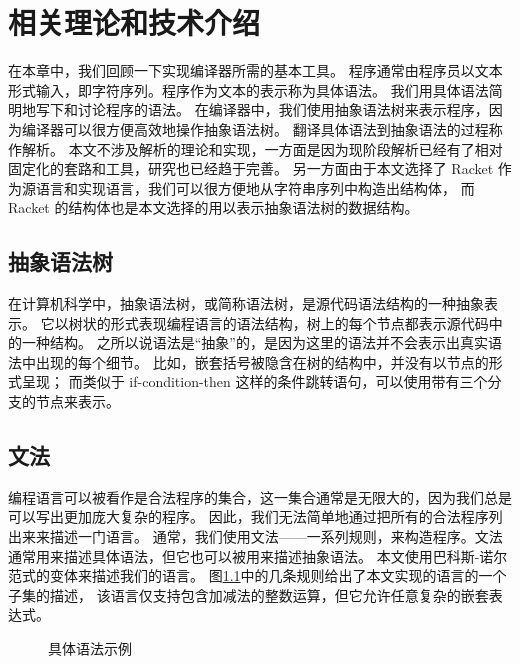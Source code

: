 
\chapter{相关理论和技术介绍}

在本章中，我们回顾一下实现编译器所需的基本工具。
程序通常由程序员以文本形式输入，即字符序列。程序作为文本的表示称为具体语法。
我们用具体语法简明地写下和讨论程序的语法。
在编译器中，我们使用抽象语法树来表示程序，因为编译器可以很方便高效地操作抽象语法树。
翻译具体语法到抽象语法的过程称作解析。
本文不涉及解析的理论和实现，一方面是因为现阶段解析已经有了相对固定化的套路和工具，研究也已经趋于完善。
另一方面由于本文选择了 Racket 作为源语言和实现语言，我们可以很方便地从字符串序列中构造出结构体，
而 Racket 的结构体也是本文选择的用以表示抽象语法树的数据结构。

\section{抽象语法树}

在计算机科学中，抽象语法树，或简称语法树，是源代码语法结构的一种抽象表示。
它以树状的形式表现编程语言的语法结构，树上的每个节点都表示源代码中的一种结构。
之所以说语法是“抽象”的，是因为这里的语法并不会表示出真实语法中出现的每个细节。
比如，嵌套括号被隐含在树的结构中，并没有以节点的形式呈现；
而类似于 if-condition-then 这样的条件跳转语句，可以使用带有三个分支的节点来表示。

\section{文法}

编程语言可以被看作是合法程序的集合，这一集合通常是无限大的，因为我们总是可以写出更加庞大复杂的程序。
因此，我们无法简单地通过把所有的合法程序列出来来描述一门语言。
通常，我们使用文法——一系列规则，来构造程序。文法通常用来描述具体语法，但它也可以被用来描述抽象语法。
本文使用巴科斯-诺尔范式\cite{Knuth_1964, Backus_Bauer_1960}的变体来描述我们的语言。
图\ref{fig:con-syntax-eg}中的几条规则给出了本文实现的语言的一个子集的描述，
该语言仅支持包含加减法的整数运算，但它允许任意复杂的嵌套表达式。

\begin{figure}[t]
  \caption{具体语法示例}
  \label{fig:con-syntax-eg}
\end{figure}

